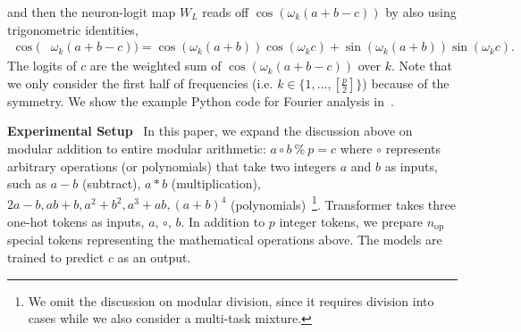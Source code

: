 \documentclass[10pt]{article} %
\begin{document}
and then the neuron-logit map $W_{L}$ reads off $\cos(\omega_k(a+b-c))$ by also using trigonometric identities,
\begin{equation}
\begin{split}
\cos(&\omega_k(a+b-c)) = \cos(\omega_k(a+b))\cos(\omega_kc) + \sin(\omega_k(a+b))\sin(\omega_kc).
\end{split}
\label{eq:read_off}
\end{equation}
The logits of $c$ are the weighted sum of $\cos(\omega_k(a+b-c))$ over $k$.
Note that we only consider the first half of frequencies (i.e. $k \in \{1, ..., [\frac{p}{2}]\}$) because of the symmetry.
We show the example Python code for Fourier analysis in~.



\textbf{Experimental Setup}~
In this paper, we expand the discussion above on modular addition to entire modular arithmetic: $a \circ b~\%~p = c$ where $\circ$ represents arbitrary operations (or polynomials) that take two integers $a$ and $b$ as inputs, such as $a-b$ (subtract), $a*b$ (multiplication), $2a-b, ab+b, a^2+b^2, a^3+ab, (a+b)^4$ (polynomials)~\footnote{We omit the discussion on modular division, since it requires division into cases while we also consider a multi-task mixture.}.
Transformer takes three one-hot tokens as inputs, $a$, $\circ$, $b$.
In addition to $p$ integer tokens, we prepare $n_{\text{op}}$ special tokens representing the mathematical operations above.
The models are trained to predict $c$ as an output.
\end{document}
